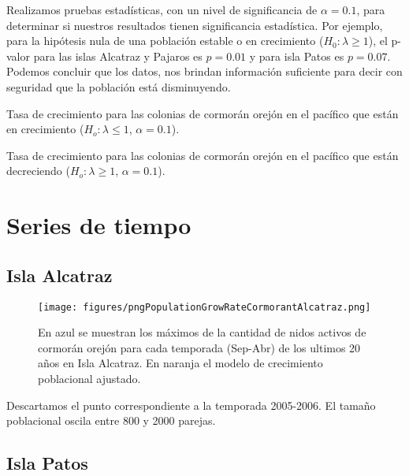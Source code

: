 \documentclass{article} %
\begin{document}
Realizamos pruebas estadísticas, con un nivel de significancia de $\alpha = 0.1$, para determinar si nuestros resultados tienen significancia estadística. Por ejemplo, para la hipótesis nula de una población estable o en crecimiento ($H_0: \lambda\geq 1$), el p-valor para las islas Alcatraz y Pajaros es $p=0.01$ y para isla Patos es $p=0.07$. Podemos concluir que los datos, nos brindan información suficiente para decir con seguridad que la población está disminuyendo.

\begin{table}[H]
\centering
\caption{Tasa de crecimiento para las colonias de cormorán orejón en el pacífico que están en crecimiento ($H_o: \lambda\leq 1$, $\alpha = 0.1$).}
\label{tab:csvPobAumentando}
\end{table}


\begin{table}[H]
\centering
\caption{Tasa de crecimiento para las colonias de cormorán orejón en el pacífico que están decreciendo ($H_o: \lambda\geq 1$, $\alpha = 0.1$).}
\label{tab:csvPobDisminuyendo}
\end{table}


\section*{Series de tiempo}

\subsection*{Isla Alcatraz}

\begin{figure}[H]
\hspace{-2cm}
    \texttt{[image: figures/pngPopulationGrowRateCormorantAlcatraz.png]}
\caption{En azul se muestran los máximos de la cantidad de nidos activos de cormorán orejón para cada temporada (Sep-Abr) de los ultimos 20 años en Isla Alcatraz. En naranja el modelo de crecimiento poblacional ajustado.}
\end{figure}

Descartamos el punto correspondiente a la temporada 2005-2006. El tamaño poblacional oscila entre 800 y 2000 parejas. 

\subsection*{Isla Patos}
\end{document}
